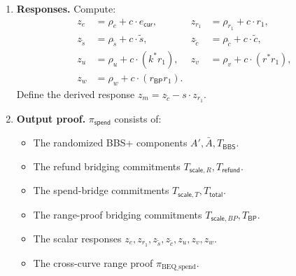 \documentclass[11pt]{article}
\theoremstyle{definitionstyle}
\theoremstyle{plain}
\begin{document}
\begin{enumerate}[leftmargin=*]
\[\begin{aligned}
    &\parallel T_{\mathsf{scale},T} \parallel T_{\mathsf{total}}
    \parallel T_{\mathsf{scale},BP} \parallel T_{\mathsf{BP}} \parallel \text{``Spend''}
  \bigr).
  \end{aligned}
  \]
\item \textbf{Responses.}
  Compute:
  \begin{align*}
    z_e &= \rho_e + c \cdot e_{\mathsf{cur}}, & z_{r_1} &= \rho_{r_1} + c \cdot r_1, \\
    z_{\tilde{s}} &= \rho_{\tilde{s}} + c \cdot \tilde{s}, & z_{\tilde{c}} &= \rho_{\tilde{c}} + c \cdot \tilde{c}, \\
    z_u &= \rho_u + c \cdot (k^* r_1), & z_v &= \rho_v + c \cdot (r^* r_1), \\
    z_w &= \rho_w + c \cdot (r_{\mathsf{BP}} r_1).
  \end{align*}
  Define the derived response $z_m = z_{\tilde{c}} - s \cdot z_{r_1}$.
\item \textbf{Output proof.}
  $\pi_{\mathsf{spend}}$ consists of:
  \begin{itemize}[leftmargin=*, nosep]
  \item The randomized BBS+ components $A', \bar{A}, T_{\mathsf{BBS}}$.
  \item The refund bridging commitments $T_{\mathsf{scale},R}, T_{\mathsf{refund}}$.
  \item The spend-bridge commitments $T_{\mathsf{scale},T}, T_{\mathsf{total}}$.
  \item The range-proof bridging commitments $T_{\mathsf{scale},BP}, T_{\mathsf{BP}}$.
  \item The scalar responses $z_e, z_{r_1}, z_{\tilde{s}}, z_{\tilde{c}}, z_u, z_v, z_w$.
  \item The cross-curve range proof $\pi_{\text{BEQ\_spend}}$.
  \end{itemize}
\end{enumerate}
\end{document}
